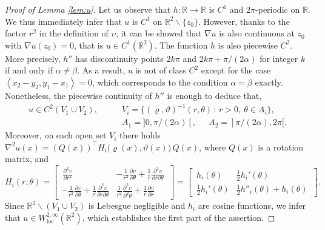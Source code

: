 \documentclass[11pt,letterpaper,reqno]{amsart}
\theoremstyle{definition}
\numberwithin{equation}{section}
\newcommand{\R}{\mathbb{R}}
\newcommand{\pairing}[1]{{\left \langle #1 \right \rangle}}
\begin{document}
{\begin{proof}[Proof of Lemma \ref{lem:u}]	
	Let us observe that  $h:\R \to \R$ is $C^1$ and $2\pi$-periodic  on $\R$. We thus immediately infer that $u$ is $C^1$ on $\R^2 \backslash \{z_0\}$. However, thanks to the factor $r^2$ in the definition of $\upsilon$, it can be showed that $\nabla u$ is also continuous at $z_0$ with $\nabla u(z_0) = 0$, that is $u \in C^1(\R^2)$. The
	function $h$ is also piecewise $C^2$. More precisely, $h''$ has discontinuity points $2k \pi$ and $ 2k \pi + \pi/(2\alpha)$ for integer $k$ if and only if  $\alpha \neq \beta$. As a result, $u$ is not of class $C^2$ except for the case $\pairing{x_2-y_2,y_1-x_1}  = 0$, which corresponds to the condition $\alpha = \beta$ exactly. Nonetheless, the piecewise continuity of $h''$ is enough to deduce that,
	\begin{align*}
		u \in C^2(V_1  \cup V_2), \qquad &V_i = \big\{ (\varrho,\vartheta)^{-1}(r,\theta) \, : \, r>0, \  \theta\in A_i  \big\}, \\
		&A_1 = ]0, \pi/(2\alpha)[, \quad \ \ A_2 = ]\pi/(2\alpha),2\pi[.
	\end{align*}
	Moreover, on each open set $V_i$ there holds $\nabla^2 u (x) = (Q(x))^\top H_i\big( \varrho(x), \vartheta(x) \big) \, Q(x)$, where $Q(x)$ is a rotation matrix, and
	\begin{equation*}
		H_i(r,\theta) = \begin{bmatrix}
			\,\frac{\partial^2 \upsilon}{\partial r^2}  &  -\frac{1}{r^2}\frac{\partial \upsilon}{\partial \theta}+ \frac{1}{r}\frac{\partial^2 \upsilon}{\partial r \partial \theta} \,\\
			-\frac{1}{r^2}\frac{\partial \upsilon}{\partial \theta}+ \frac{1}{r}\frac{\partial^2 \upsilon}{\partial r \partial \theta} & \frac{1}{r^2}\frac{\partial^2 \upsilon}{\partial^2 \theta}  + \frac{1}{r}\frac{\partial\upsilon}{\partial r}  \,
		\end{bmatrix} = 
		\begin{bmatrix}
			\, h_i(\theta) &  \frac{1}{2} h_i'(\theta) \,\\
			\,\frac{1}{2} h_i'(\theta) & \frac{1}{2} h''_i(\theta) + h_i(\theta) \,
		\end{bmatrix}.
	\end{equation*}
	Since $\R^2\backslash (V_1 \cup V_2)$ is Lebesgue negligible and $h_i$ are cosine functions, we infer that $u \in W^{2,\infty}_{\mathrm{loc}}(\R^2)$, which establishes the first part of the assertion.
	

\end{proof}}
\end{document}
